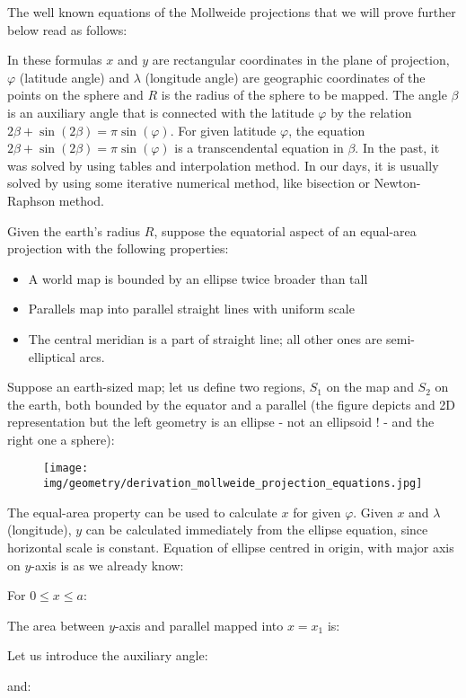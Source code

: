 	The well known equations of the Mollweide projections that we will prove further below read as follows:
	
	In these formulas $x$ and $y$ are rectangular coordinates in the plane of projection, $\varphi$ (latitude angle) and $\lambda$ (longitude angle) are geographic coordinates of the points on the sphere and $R$ is the radius of the sphere to be mapped. The angle $\beta$ is an auxiliary angle that is connected with the latitude $\varphi$ by the relation $2\beta+\sin(2\beta)=\pi\sin(\varphi)$. For given latitude $\varphi$, the equation $2\beta+\sin(2\beta)=\pi\sin(\varphi)$ is a transcendental equation in $\beta$. In the past, it was solved by using tables and interpolation method. In our days, it is usually solved by using some iterative numerical method, like bisection or Newton-Raphson method.
	\begin{dem}
	Given the earth's radius $R$, suppose the equatorial aspect of an equal-area projection with the following properties:
	\begin{itemize}
		\item A world map is bounded by an ellipse twice broader than tall
		\item Parallels map into parallel straight lines with uniform scale
		\item The central meridian is a part of straight line; all other ones are semi-elliptical arcs.
	\end{itemize}
	Suppose an earth-sized map; let us define two regions, $S_{1}$ on the map and $S_{2}$ on the earth, both bounded by the equator and a parallel (the figure depicts and 2D representation but the left geometry is an ellipse - not an ellipsoid ! - and the right one a sphere):
	\begin{figure}[H]
		\centering
		\texttt{[image: img/geometry/derivation\_mollweide\_projection\_equations.jpg]}
	\end{figure}
	The equal-area property can be used to calculate $x$ for given $\varphi$. Given $x$ and $\lambda$ (longitude), $y$ can be calculated immediately from the ellipse equation, since horizontal scale is constant. Equation of ellipse centred in origin, with major axis on $y$-axis is as we already know:
	
	For $0 \leq x \leq a$:
	
	The area between $y$-axis and parallel mapped into $x=x_{1}$ is:
	
	Let us introduce the auxiliary angle:
	
	and:
	

\end{dem}
